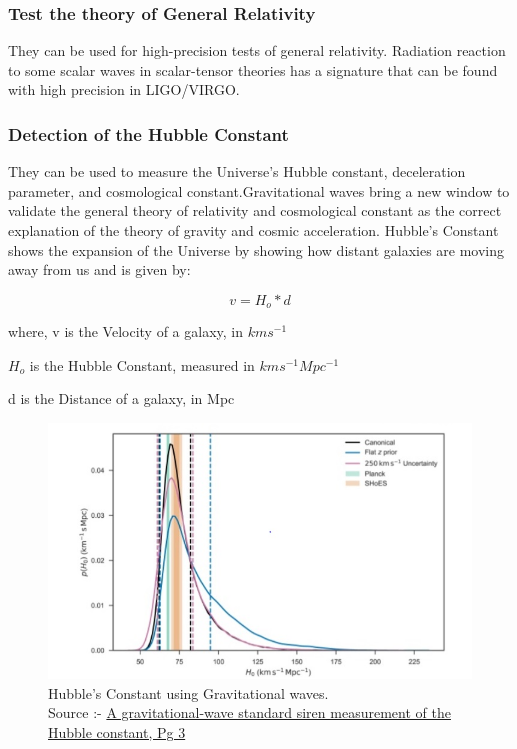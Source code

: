 \subsubsection*{Test the theory of General Relativity}
\hspace{1cm}They can be used for high-precision tests of general relativity. Radiation reaction to some scalar waves in scalar-tensor theories has a signature that can be found with high precision in LIGO/VIRGO.

\subsubsection*{Detection of the Hubble Constant}
\hspace{1cm}They can be used to measure the Universe’s Hubble constant, deceleration parameter, and cosmological constant.Gravitational waves bring a new window to validate the general theory of relativity and cosmological constant as the correct explanation of the theory of gravity and cosmic acceleration. Hubble's Constant shows the expansion of the Universe by showing how distant galaxies are moving away from us and is given by:
 
\begin{equation}
v = H_o*d
\end{equation}

where, v is the Velocity of a galaxy, in $kms^{-1}$

      $H_{o}$ is the Hubble Constant, measured in $kms^{-1}Mpc^{-1}$
      
      d is the Distance of a galaxy, in Mpc

\vspace{1cm}

\begin{figure}[h]
    \centering
    \includegraphics[scale=0.9]{images.tex/HCGW.jpg}
    \caption{Hubble's Constant using Gravitational waves.\\
    Source :- \href{https://www.researchgate.net/profile/Michael-Ross-9/publication/324600496}{A gravitational-wave standard siren measurement of the Hubble constant, Pg 3}}
\end{figure}

